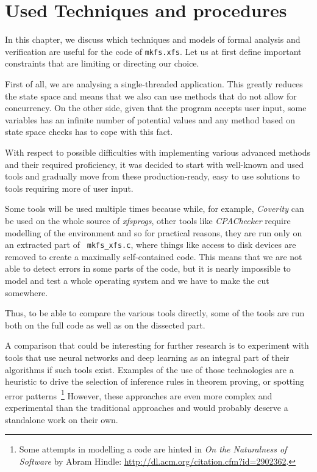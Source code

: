
\chapter{Used Techniques and procedures}\label{chap:techniques}

In this chapter, we discuss which techniques and models of formal analysis and verification are useful for the code of {\tt mkfs.xfs}. Let us at first define important constraints that are limiting or directing our choice.

First of all, we are analysing a single-threaded application. This greatly reduces the state space and means that we also can use methods that do not allow for concurrency. On the other side, given that the program accepts user input, some variables has an infinite number of potential values and any method based on state space checks has to cope with this fact.

With respect to possible difficulties with implementing various advanced
methods and their required proficiency, it was decided to start with well-known
and used tools and gradually move from these production-ready, easy to use
solutions to tools requiring more of user input.

Some tools will be used multiple times because while, for example, {\em
	Coverity} can be used on the whole source of {\em xfsprogs}, other
	tools like {\em CPAChecker} require modelling of the environment and so
	for practical reasons, they are run only on an extracted part of {\tt
		mkfs\_xfs.c}, where things like access to disk devices are
		removed to create a maximally self-contained code. This means
		that we are not able to detect errors in some parts of the
		code, but it is nearly impossible to model and test a whole
		operating system and we have to make the cut somewhere.

Thus, to be able to compare the various tools directly, some of the tools are run both on the full code as well as on the dissected part.

A comparison that could be interesting for further research is to experiment
with tools that use neural networks and deep learning as an integral part of
their algorithms if such tools exist. Examples of the use of those technologies
are a heuristic to drive the selection of inference rules in theorem proving,
or spotting error patterns~\footnote{Some attempts in modelling a code are
hinted in {\em On the Naturalness of Software} by Abram Hindle:
\url{http://dl.acm.org/citation.cfm?id=2902362}.} However, these approaches are
even more complex and experimental than the traditional approaches and
would probably deserve a standalone work on their own.

